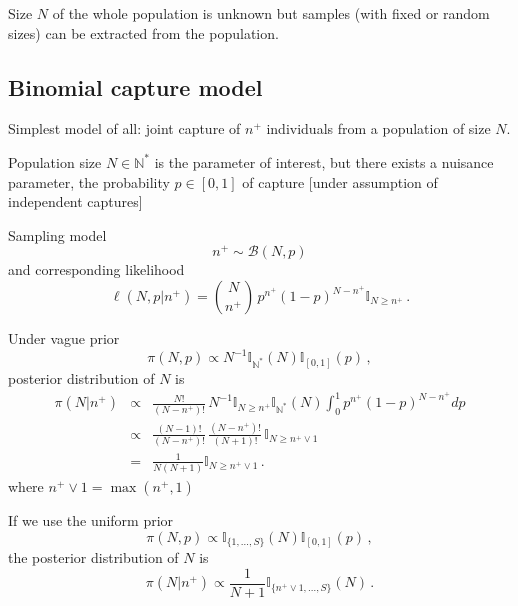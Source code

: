 \begin{slide}
\end{slide}\begin{slide} 

Size $N$ of the whole population is unknown
but samples (with fixed or random sizes) can 
be extracted from the population. 

\end{slide}\subsection{Binomial capture model}\begin{slide}

Simplest model of all: joint capture of $n^+$ individuals from a population of size $N$.

\vs\pause Population size $N\in\mathbb{N}^*$ is the parameter of interest, but there exists a
nuisance  parameter, the probability $p\in[0,1]$ of capture [under assumption of independent captures]

\vs\pause
Sampling model
$$
n^+ \sim \mathscr{B}(N,p)
$$
and corresponding likelihood 
$$
\ell(N,p|n^+)={N \choose n^+}\,p^{n^+}(1-p)^{N-n^+}\mathbb{I}_{N\ge n^+}\,.
$$

\end{slide}\begin{slide}
Under vague prior
$$
\pi(N,p)\propto N^{-1}\mathbb{I}_{\mathbb{N}^*}(N)\mathbb{I}_{[0,1]}(p)\,,
$$
posterior distribution of $N$ is 
\small\begin{eqnarray*}
\pi(N|n^+) & \propto & \frac{N!}{(N-n^+)!}\,N^{-1}\mathbb{I}_{N\ge n^+}\mathbb{I}_{\mathbb{N}^*}(N)\int_0^1 p^{n^+}(1-p)^{N-n^+}dp \\
           & \propto & \frac{(N-1)!}{(N-n^+)!}\,\frac{(N-n^+)!}{(N+1)!}\,\mathbb{I}_{N\geq n^+\vee 1} \\
           & =       & \frac{1}{N(N+1)}\mathbb{I}_{N\geq n^+\vee 1}\,.
\end{eqnarray*}
\normalsize where $n^+\vee 1=\max(n^+,1)$

\end{slide}\begin{slide}
If we use the uniform prior
$$
\pi(N,p)\propto \mathbb{I}_{\{1,\ldots,S\}}(N)\mathbb{I}_{[0,1]}(p)\,,
$$
the posterior distribution of $N$ is
$$
\pi(N|n^+)\propto \frac{1}{N+1}\mathbb{I}_{\{n^+\vee 1,\ldots,S\}}(N)\,.
$$

\end{slide}
